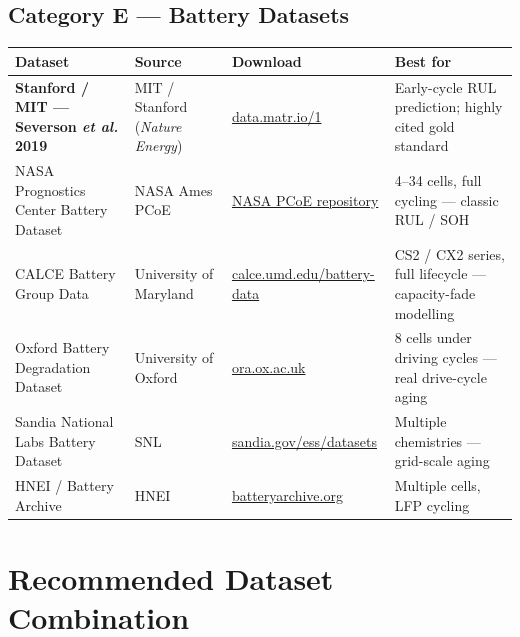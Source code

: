 \documentclass[11pt,a4paper]{article}
\begin{document}
\subsection{Category E --- Battery Datasets}

\begin{longtable}{p{3.8cm}p{2.6cm}p{4.4cm}p{3.2cm}}
\toprule
\textbf{Dataset} & \textbf{Source} & \textbf{Download} & \textbf{Best for} \\
\midrule
\endhead

\textbf{Stanford / MIT --- Severson \textit{et al.} 2019} & MIT / Stanford
(\textit{Nature Energy}) &
\href{https://data.matr.io/1/}{data.matr.io/1} &
Early-cycle RUL prediction; highly cited gold standard \\

NASA Prognostics Center Battery Dataset & NASA Ames PCoE &
\href{https://www.nasa.gov/intelligent-systems-division/discovery-and-systems-health/pcoe/pcoe-data-set-repository/}{NASA PCoE repository} &
4--34 cells, full cycling --- classic RUL / SOH \\

CALCE Battery Group Data & University of Maryland &
\href{https://calce.umd.edu/battery-data}{calce.umd.edu/battery-data} &
CS2 / CX2 series, full lifecycle --- capacity-fade modelling \\

Oxford Battery Degradation Dataset & University of Oxford &
\href{https://ora.ox.ac.uk/objects/uuid:03ba4b01-cfed-46d3-9b1a-7d4a7bdf6fac}{ora.ox.ac.uk} &
8 cells under driving cycles --- real drive-cycle aging \\

Sandia National Labs Battery Dataset & SNL &
\href{https://www.sandia.gov/ess/tools-resources/datasets/}{sandia.gov/ess/datasets} &
Multiple chemistries --- grid-scale aging \\

HNEI / Battery Archive & HNEI &
\href{https://www.batteryarchive.org/}{batteryarchive.org} &
Multiple cells, LFP cycling \\
\bottomrule
\end{longtable}

\section{Recommended Dataset Combination}
\end{document}
